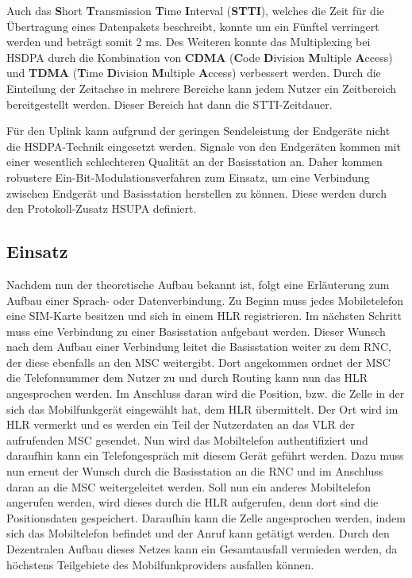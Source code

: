 \begin{multicols}{3}
Auch das \textbf{S}hort \textbf{T}ransmission \textbf{T}ime \textbf{I}nterval (\textbf{STTI}), welches die Zeit für die Übertragung eines Datenpakets beschreibt, konnte um ein Fünftel verringert werden und beträgt somit 2 ms.  Des Weiteren konnte das Multiplexing bei HSDPA durch die Kombination von \textbf{CDMA} (\textbf{C}ode \textbf{D}ivision \textbf{M}ultiple \textbf{A}ccess) und \textbf{TDMA} (\textbf{T}ime \textbf{D}ivision \textbf{M}ultiple \textbf{A}ccess) verbessert werden. Durch die Einteilung der Zeitachse in mehrere Bereiche kann jedem Nutzer ein Zeitbereich bereitgestellt werden. Dieser Bereich hat dann die STTI-Zeitdauer.~\cite{3G.1, 3G.3}

Für den Uplink kann aufgrund der geringen Sendeleistung der Endgeräte nicht die HSDPA-Technik eingesetzt werden. Signale von den Endgeräten kommen mit einer wesentlich schlechteren Qualität an der Basisstation an. Daher kommen robustere Ein-Bit-Modulationsverfahren zum Einsatz, um eine Verbindung zwischen Endgerät und Basisstation herstellen zu können. Diese werden durch den Protokoll-Zusatz HSUPA definiert.~\cite{3G.8}

\subsection*{Einsatz}
Nachdem nun der theoretische Aufbau bekannt ist, folgt eine Erläuterung zum Aufbau einer Sprach- oder Datenverbindung. Zu Beginn muss jedes Mobiletelefon eine SIM-Karte besitzen und sich in einem HLR registrieren. Im nächsten Schritt muss eine Verbindung zu einer Basisstation aufgebaut werden. Dieser Wunsch nach dem Aufbau einer Verbindung leitet die Basisstation weiter zu dem RNC, der diese ebenfalls an den MSC weitergibt. Dort angekommen ordnet der MSC die Telefonnummer dem Nutzer zu und durch Routing kann nun das HLR angesprochen werden. Im Anschluss daran wird die Position, bzw. die Zelle in der sich das Mobilfunkgerät eingewählt hat, dem HLR übermittelt. Der Ort wird im HLR vermerkt und es werden ein Teil der Nutzerdaten an das VLR der aufrufenden MSC gesendet. Nun wird das Mobiltelefon authentifiziert und daraufhin kann ein Telefongespräch mit diesem Gerät geführt werden. Dazu muss nun erneut der Wunsch durch die Basisstation an die RNC und im Anschluss daran an die MSC weitergeleitet werden. Soll nun ein anderes Mobiltelefon angerufen werden, wird dieses durch die HLR aufgerufen, denn dort sind die Positionsdaten gespeichert. Daraufhin kann die Zelle angesprochen werden, indem sich das Mobiltelefon befindet und der Anruf kann getätigt werden. 
Durch den Dezentralen Aufbau dieses Netzes kann ein Gesamtausfall vermieden werden, da höchstens Teilgebiete des Mobilfunkproviders ausfallen können. ~\cite{3G.1}


\end{multicols}
